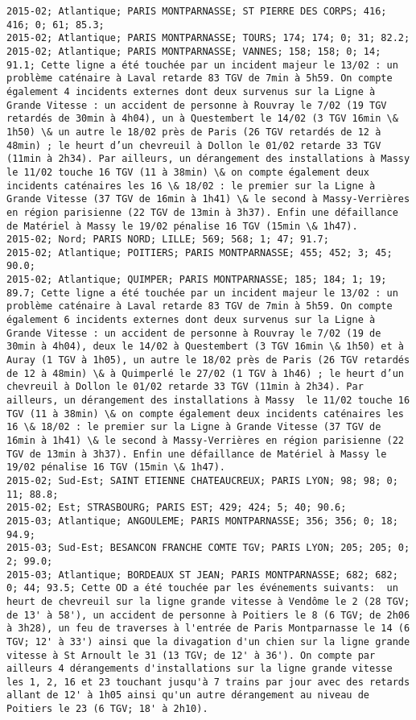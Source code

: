 \documentclass{article}
\begin{document}
\begin{Verbatim}[commandchars=\\\{\}]
2015-02; Atlantique; PARIS MONTPARNASSE; ST PIERRE DES CORPS; 416; 416; 0; 61; 85.3; 
2015-02; Atlantique; PARIS MONTPARNASSE; TOURS; 174; 174; 0; 31; 82.2; 
2015-02; Atlantique; PARIS MONTPARNASSE; VANNES; 158; 158; 0; 14; 91.1; Cette ligne a été touchée par un incident majeur le 13/02 : un problème caténaire à Laval retarde 83 TGV de 7min à 5h59. On compte également 4 incidents externes dont deux survenus sur la Ligne à Grande Vitesse : un accident de personne à Rouvray le 7/02 (19 TGV retardés de 30min à 4h04), un à Questembert le 14/02 (3 TGV 16min \& 1h50) \& un autre le 18/02 près de Paris (26 TGV retardés de 12 à 48min) ; le heurt d’un chevreuil à Dollon le 01/02 retarde 33 TGV (11min à 2h34). Par ailleurs, un dérangement des installations à Massy  le 11/02 touche 16 TGV (11 à 38min) \& on compte également deux incidents caténaires les 16 \& 18/02 : le premier sur la Ligne à Grande Vitesse (37 TGV de 16min à 1h41) \& le second à Massy-Verrières en région parisienne (22 TGV de 13min à 3h37). Enfin une défaillance de Matériel à Massy le 19/02 pénalise 16 TGV (15min \& 1h47).
2015-02; Nord; PARIS NORD; LILLE; 569; 568; 1; 47; 91.7; 
2015-02; Atlantique; POITIERS; PARIS MONTPARNASSE; 455; 452; 3; 45; 90.0; 
2015-02; Atlantique; QUIMPER; PARIS MONTPARNASSE; 185; 184; 1; 19; 89.7; Cette ligne a été touchée par un incident majeur le 13/02 : un problème caténaire à Laval retarde 83 TGV de 7min à 5h59. On compte également 6 incidents externes dont deux survenus sur la Ligne à Grande Vitesse : un accident de personne à Rouvray le 7/02 (19 de 30min à 4h04), deux le 14/02 à Questembert (3 TGV 16min \& 1h50) et à Auray (1 TGV à 1h05), un autre le 18/02 près de Paris (26 TGV retardés de 12 à 48min) \& à Quimperlé le 27/02 (1 TGV à 1h46) ; le heurt d’un chevreuil à Dollon le 01/02 retarde 33 TGV (11min à 2h34). Par ailleurs, un dérangement des installations à Massy  le 11/02 touche 16 TGV (11 à 38min) \& on compte également deux incidents caténaires les 16 \& 18/02 : le premier sur la Ligne à Grande Vitesse (37 TGV de 16min à 1h41) \& le second à Massy-Verrières en région parisienne (22 TGV de 13min à 3h37). Enfin une défaillance de Matériel à Massy le 19/02 pénalise 16 TGV (15min \& 1h47).
2015-02; Sud-Est; SAINT ETIENNE CHATEAUCREUX; PARIS LYON; 98; 98; 0; 11; 88.8; 
2015-02; Est; STRASBOURG; PARIS EST; 429; 424; 5; 40; 90.6; 
2015-03; Atlantique; ANGOULEME; PARIS MONTPARNASSE; 356; 356; 0; 18; 94.9; 
2015-03; Sud-Est; BESANCON FRANCHE COMTE TGV; PARIS LYON; 205; 205; 0; 2; 99.0; 
2015-03; Atlantique; BORDEAUX ST JEAN; PARIS MONTPARNASSE; 682; 682; 0; 44; 93.5; Cette OD a été touchée par les événements suivants:  un heurt de chevreuil sur la ligne grande vitesse à Vendôme le 2 (28 TGV; de 13' à 58'), un accident de personne à Poitiers le 8 (6 TGV; de 2h06 à 3h28), un feu de traverses à l'entrée de Paris Montparnasse le 14 (6 TGV; 12' à 33') ainsi que la divagation d'un chien sur la ligne grande vitesse à St Arnoult le 31 (13 TGV; de 12' à 36'). On compte par ailleurs 4 dérangements d'installations sur la ligne grande vitesse les 1, 2, 16 et 23 touchant jusqu'à 7 trains par jour avec des retards allant de 12' à 1h05 ainsi qu'un autre dérangement au niveau de  Poitiers le 23 (6 TGV; 18' à 2h10).

\end{Verbatim}
\end{document}
